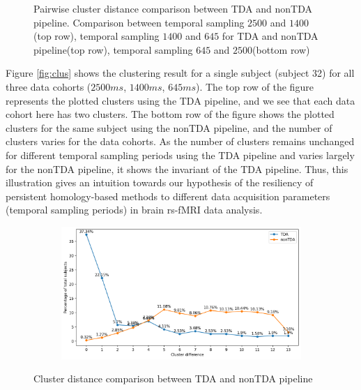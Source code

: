 \begin{figure}[H]
\begin{subfigure}[t]{1\linewidth}
	\end{subfigure}
	\caption{Pairwise cluster distance comparison between TDA and nonTDA pipeline. Comparison between temporal sampling $2500$ and $1400$ (top row), temporal sampling $1400$ and $645$ for TDA and nonTDA pipeline(top row), temporal sampling $645$ and $2500$(bottom row)}
	\label{fig:clus_distance_pairwise}
\end{figure}

Figure \ref{fig:clus} shows the clustering result for a single subject (subject 32) for all three data cohorts ($2500ms$, $1400ms$, $645ms$). The top row of the figure represents the plotted clusters using the TDA pipeline, and we see that each data cohort here has two clusters. The bottom row of the figure shows the plotted clusters for the same subject using the nonTDA pipeline, and the number of clusters varies for the data cohorts. As the number of clusters remains unchanged for different temporal sampling periods using the TDA pipeline and varies largely for the nonTDA pipeline, it shows the invariant of the TDA pipeline. Thus, this illustration gives an intuition towards our hypothesis of the resiliency of persistent homology-based methods to different data acquisition parameters (temporal sampling periods) in brain rs-fMRI data analysis.

\begin{figure}[H]%
	\centering
	\begin{subfigure}[t]{1\textwidth}
		\centering
		\hspace{8mm}
		\includegraphics[width=1\textwidth, trim={0cm, 0.0cm, 0.0cm, 0.0cm}]{figures/tda_nontda.png}\hfill
	\end{subfigure}
	\caption{Cluster distance comparison between TDA and nonTDA pipeline}
	\label{fig:clus_distance}
\end{figure}

